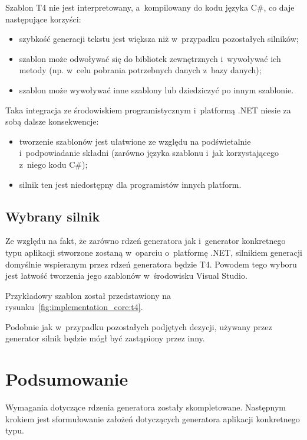 Szablon T4 nie jest interpretowany, a~kompilowany do kodu języka C\#, co daje następujące korzyści:

\begin{itemize}
 \item szybkość generacji tekstu jest większa niż w~przypadku pozostałych silników;
 \item szablon może odwoływać się do bibliotek zewnętrznych i~wywoływać ich metody (np. w~celu pobrania potrzebnych danych z~bazy danych);
 \item szablon może wywoływać inne szablony lub dziedziczyć po innym szablonie.
\end{itemize}

Taka integracja ze środowiskiem programistycznym i~platformą .NET niesie za sobą dalsze konsekwencje:

\begin{itemize}
 \item tworzenie szablonów jest ułatwione ze względu na podświetalnie i~podpowiadanie składni (zarówno języka szablonu i~jak korzystającego z~niego kodu C\#);
 \item silnik ten jest niedostępny dla programistów innych platform.
\end{itemize}


\subsection{Wybrany silnik}

Ze względu na fakt, że zarówno rdzeń generatora jak i~generator konkretnego typu aplikacji stworzone zostaną w~oparciu o~platformę .NET, silnikiem generacji domyślnie wspieranym przez rdzeń generatora będzie T4.
Powodem tego wyboru jest łatwość tworzenia jego szablonów w~środowisku Visual Studio.

Przykładowy szablon został przedstawiony na rysunku~\ref{fig:implementation_core:t4}.



Podobnie jak w~przypadku pozostałych podjętych dezycji, używany przez generator silnik będzie mógł być zastąpiony przez inny.



\section{Podsumowanie}

Wymagania dotyczące rdzenia generatora zostały skompletowane.
Następnym krokiem jest sformułowanie założeń dotyczących generatora aplikacji konkretnego typu.
